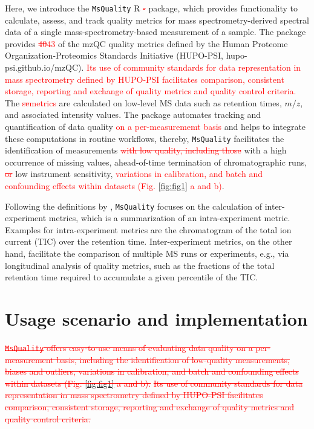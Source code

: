 \documentclass[unnumsec,webpdf,contemporary,large]{oup-authoring-template}%
\theoremstyle{thmstyleone}%
\theoremstyle{thmstyletwo}%
\theoremstyle{thmstylethree}%
\begin{document}
Here, we introduce the \texttt{MsQuality} R \textcolor{red}{\sout{-} }package, which provides 
functionality to calculate, assess, and track quality metrics for mass 
spectrometry-derived spectral data of a single mass-spectrometry-based 
measurement of a sample. 
The package provides \textcolor{red}{\sout{40}}\textcolor{red}{43} of the mzQC quality metrics defined by
the Human Proteome Organization-Proteomics Standards Initiative (HUPO-PSI,
hupo-psi.github.io/mzQC). 
\textcolor{red}{Its use of community standards for data
representation in mass spectrometry defined by HUPO-PSI facilitates comparison, 
consistent
storage, reporting and exchange of quality metrics and quality control criteria.}
The \textcolor{red}{\sout{se}}\textcolor{red}{metrics} are calculated on low-level MS data
such as retention times, $m/z$, and associated intensity values.
The package automates tracking and quantification of data quality 
\textcolor{red}{on a per-measurememt basis} and 
helps to integrate these computations in routine workflows, thereby,
\texttt{MsQuality} facilitates the identification of measurements \textcolor{red}{\sout{with low 
quality, including those}} with a high occurrence of missing values, 
ahead-of-time termination of chromatographic runs, \textcolor{red}{\sout{or}} low instrument sensitivity,
\textcolor{red}{variations in calibration, and batch and confounding 
effects within datasets (Fig. \ref{fig:fig1} a and b)}. 

Following the definitions by \cite{Bittremieux2017}, \texttt{MsQuality}
focuses on the calculation of inter-experiment metrics, which is a
summarization of an intra-experiment metric. Examples for
intra-experiment metrics are the chromatogram of the total ion current (TIC) 
over the retention time. Inter-experiment metrics, on the other hand, 
facilitate the comparison of multiple MS runs or experiments, 
e.g., via longitudinal analysis of quality metrics, such as the
fractions of the total retention time required to accumulate a given
percentile of the TIC.

\section{Usage scenario and implementation} \label{usagescenario}

\textcolor{red}{\sout{\texttt{MsQuality} offers easy-to-use means of evaluating data quality on a
per-measurement basis, including the identification of low-quality measurements,
biases and outliers, variations in calibration, and batch and confounding effects within
datasets (Fig. \ref{fig:fig1} a and b). }}
\textcolor{red}{\sout{Its use of community standards for data
representation in mass spectrometry defined by HUPO-PSI facilitates comparison, 
consistent
storage, reporting and exchange of quality metrics and quality control criteria.}}
\end{document}

